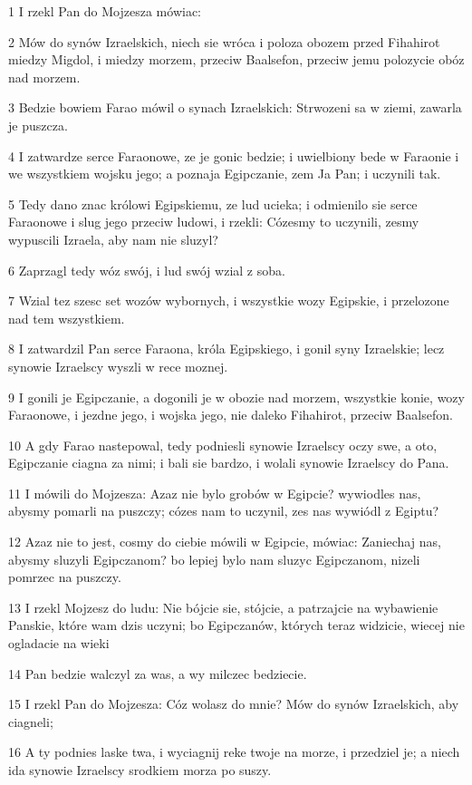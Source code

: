 \par 1 I rzekl Pan do Mojzesza mówiac:
\par 2 Mów do synów Izraelskich, niech sie wróca i poloza obozem przed Fihahirot miedzy Migdol, i miedzy morzem, przeciw Baalsefon, przeciw jemu polozycie obóz nad morzem.
\par 3 Bedzie bowiem Farao mówil o synach Izraelskich: Strwozeni sa w ziemi, zawarla je puszcza.
\par 4 I zatwardze serce Faraonowe, ze je gonic bedzie; i uwielbiony bede w Faraonie i we wszystkiem wojsku jego; a poznaja Egipczanie, zem Ja Pan; i uczynili tak.
\par 5 Tedy dano znac królowi Egipskiemu, ze lud ucieka; i odmienilo sie serce Faraonowe i slug jego przeciw ludowi, i rzekli: Cózesmy to uczynili, zesmy wypuscili Izraela, aby nam nie sluzyl?
\par 6 Zaprzagl tedy wóz swój, i lud swój wzial z soba.
\par 7 Wzial tez szesc set wozów wybornych, i wszystkie wozy Egipskie, i przelozone nad tem wszystkiem.
\par 8 I zatwardzil Pan serce Faraona, króla Egipskiego, i gonil syny Izraelskie; lecz synowie Izraelscy wyszli w rece moznej.
\par 9 I gonili je Egipczanie, a dogonili je w obozie nad morzem, wszystkie konie, wozy Faraonowe, i jezdne jego, i wojska jego, nie daleko Fihahirot, przeciw Baalsefon.
\par 10 A gdy Farao nastepowal, tedy podniesli synowie Izraelscy oczy swe, a oto, Egipczanie ciagna za nimi; i bali sie bardzo, i wolali synowie Izraelscy do Pana.
\par 11 I mówili do Mojzesza: Azaz nie bylo grobów w Egipcie? wywiodles nas, abysmy pomarli na puszczy; cózes nam to uczynil, zes nas wywiódl z Egiptu?
\par 12 Azaz nie to jest, cosmy do ciebie mówili w Egipcie, mówiac: Zaniechaj nas, abysmy sluzyli Egipczanom? bo lepiej bylo nam sluzyc Egipczanom, nizeli pomrzec na puszczy.
\par 13 I rzekl Mojzesz do ludu: Nie bójcie sie, stójcie, a patrzajcie na wybawienie Panskie, które wam dzis uczyni; bo Egipczanów, których teraz widzicie, wiecej nie ogladacie na wieki
\par 14 Pan bedzie walczyl za was, a wy milczec bedziecie.
\par 15 I rzekl Pan do Mojzesza: Cóz wolasz do mnie? Mów do synów Izraelskich, aby ciagneli;
\par 16 A ty podnies laske twa, i wyciagnij reke twoje na morze, i przedziel je; a niech ida synowie Izraelscy srodkiem morza po suszy.
